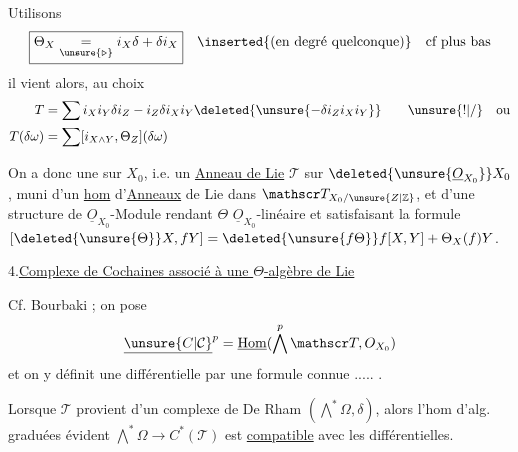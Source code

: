 Utilisons
\[
\boxed{\Theta_X\underset{\unsure{\triangleright}}{=}i_X\delta+\delta i_X}\quad\inserted{\text{(en degré quelconque)}}\quad\text{cf plus bas}
\]
il vient alors, au choix
\[
\begin{aligned}
T&=\sum i_X i_Y\delta i_Z-i_Z\delta i_X i_Y\deleted{\unsure{-\delta i_Z i_X i_Y}}\qquad \unsure{!|/}\quad\text{ou}\\
T(\delta\omega)&=\sum[i_{X\wedge Y},\Theta_Z](\delta\omega)
\end{aligned}
\]

On a donc une  sur $X_0$, i.e. un \uline{Anneau de Lie}  $\mathscr T$ sur $\deleted{\unsure{\underline O_{X_0}}}X_0$, muni d'un \uline{hom}  d'\uline{Anneaux} de Lie dans $\mathscr T_{X_0/\unsure{Z|\mathbb Z}}$, et d'une structure de $\underline O_{X_0}$-Module rendant $\Theta$ $\underline O_{X_0}$-linéaire et satisfaisant la formule $[\deleted{\unsure{\Theta}}X,fY]=\deleted{\unsure{f\Theta}}f[X,Y]+\Theta_X(f)Y$.

4.\quad \uline{Complexe de Cochaines associé à une $\Theta$-algèbre de Lie} 

Cf.  Bourbaki ; on pose 
\[
\underline{\unsure{C|\mathcal C}}^p=\underline{\mathrm{Hom}}(\bigwedge^p\mathscr T,O_{X_0})
\]
et on y définit une différentielle par une formule connue ..... .

Lorsque $\mathscr T$ provient d'un complexe de De Rham $(\bigwedge^*\Omega,\delta)$, alors l'hom d'alg. graduées évident $\bigwedge^*\Omega\longrightarrow C^*(\mathscr T)$ est \uline{compatible} avec les  différentielles.

